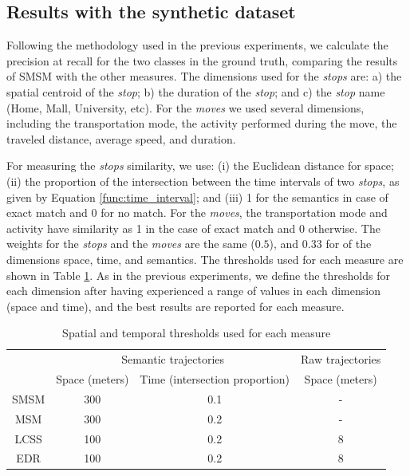 \subsection{Results with the synthetic dataset}
{Following the methodology used in the previous experiments, we calculate the precision at recall for the two classes in the ground truth, comparing the results of SMSM with the other measures. The dimensions used for the \emph{stops} are: a) the spatial centroid of the \emph{stop}; b) the duration of the \emph{stop}; and c) the \emph{stop} name (Home, Mall, University, etc). For the \emph{moves} we used several dimensions, including  the transportation mode, the activity performed during the move, the traveled distance, average speed, and duration.}

{For measuring the \emph{stops} similarity, we use: (i) the Euclidean distance for space; (ii) the proportion of the intersection between the time intervals of two \emph{stops}, as given by Equation {\ref{func:time_interval}}; and (iii) 1 for the semantics in case of exact match and 0 for no match. For the \emph{moves}, the transportation mode and activity have  similarity as 1 in the case of exact match and 0 otherwise. The weights for the \emph{stops} and the \emph{moves} are the same ($0.5$), and $0.33$ for of the  dimensions space, time, and semantics. The thresholds used for each measure are shown in Table {\ref{tab:hermoupolis_thresholds}}.  As in the previous experiments, we define the thresholds for each dimension after having experienced a range of values in each dimension (space and time), and the best results are reported for each measure.}

\begin{table}[!h]
\scriptsize
  \centering
  \begin{tabular}{|c|c|c|c|}
  \hline
  & \multicolumn{2}{c|}{Semantic trajectories} & \multicolumn{1}{c|}{Raw trajectories} \\
 	\cline{2-4}
  & Space (meters)& Time (intersection proportion) & Space (meters) \\
  \hline
 SMSM & 300 & 0.1 & - \\
 MSM & 300 & 0.2 & - \\
 LCSS & 100 & 0.2 & 8 \\
 EDR & 100 & 0.2 & 8 \\
    \hline
  \end{tabular}
  \caption{Spatial and temporal thresholds used for each measure}
  \label{tab:hermoupolis_thresholds}
\end{table}

